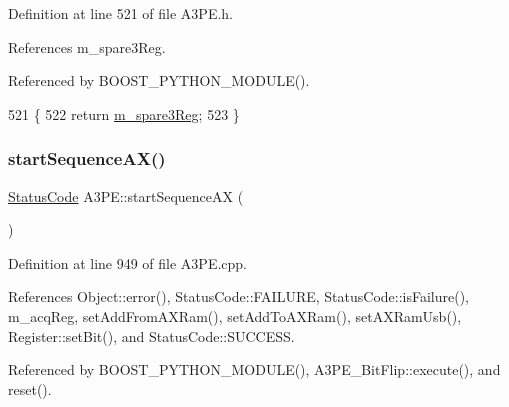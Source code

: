 Definition at line 521 of file A3\+P\+E.\+h.



References m\+\_\+spare3\+Reg.



Referenced by B\+O\+O\+S\+T\+\_\+\+P\+Y\+T\+H\+O\+N\+\_\+\+M\+O\+D\+U\+L\+E().


\begin{DoxyCode}
521                        \{
522     \textcolor{keywordflow}{return} \hyperlink{classA3PE_a1e7e5c89f190672990ae5bece2a8b1aa}{m\_spare3Reg};
523   \}
\end{DoxyCode}
\mbox{\label{classA3PE_a91ae249ca14676f8b0832487955fcf8c}} 
\subsubsection{\texorpdfstring{start\+Sequence\+A\+X()}{startSequenceAX()}}
{\footnotesize\ttfamily \hyperlink{classStatusCode}{Status\+Code} A3\+P\+E\+::start\+Sequence\+AX (\begin{DoxyParamCaption}{ }\end{DoxyParamCaption})}



Definition at line 949 of file A3\+P\+E.\+cpp.



References Object\+::error(), Status\+Code\+::\+F\+A\+I\+L\+U\+RE, Status\+Code\+::is\+Failure(), m\+\_\+acq\+Reg, set\+Add\+From\+A\+X\+Ram(), set\+Add\+To\+A\+X\+Ram(), set\+A\+X\+Ram\+Usb(), Register\+::set\+Bit(), and Status\+Code\+::\+S\+U\+C\+C\+E\+SS.



Referenced by B\+O\+O\+S\+T\+\_\+\+P\+Y\+T\+H\+O\+N\+\_\+\+M\+O\+D\+U\+L\+E(), A3\+P\+E\+\_\+\+Bit\+Flip\+::execute(), and reset().


